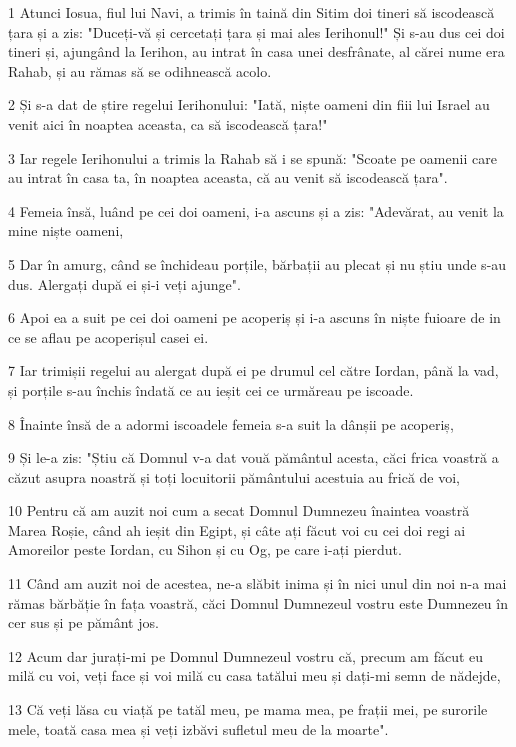\par 1 Atunci Iosua, fiul lui Navi, a trimis în taină din Sitim doi tineri să iscodească țara și a zis: "Duceți-vă și cercetați țara și mai ales Ierihonul!" Și s-au dus cei doi tineri și, ajungând la Ierihon, au intrat în casa unei desfrânate, al cărei nume era Rahab, și au rămas să se odihnească acolo.
\par 2 Și s-a dat de știre regelui Ierihonului: "Iată, niște oameni din fiii lui Israel au venit aici în noaptea aceasta, ca să iscodească țara!"
\par 3 Iar regele Ierihonului a trimis la Rahab să i se spună: "Scoate pe oamenii care au intrat în casa ta, în noaptea aceasta, că au venit să iscodească țara".
\par 4 Femeia însă, luând pe cei doi oameni, i-a ascuns și a zis: "Adevărat, au venit la mine niște oameni,
\par 5 Dar în amurg, când se închideau porțile, bărbații au plecat și nu știu unde s-au dus. Alergați după ei și-i veți ajunge".
\par 6 Apoi ea a suit pe cei doi oameni pe acoperiș și i-a ascuns în niște fuioare de in ce se aflau pe acoperișul casei ei.
\par 7 Iar trimișii regelui au alergat după ei pe drumul cel către Iordan, până la vad, și porțile s-au închis îndată ce au ieșit cei ce urmăreau pe iscoade.
\par 8 Înainte însă de a adormi iscoadele femeia s-a suit la dânșii pe acoperiș,
\par 9 Și le-a zis: "Știu că Domnul v-a dat vouă pământul acesta, căci frica voastră a căzut asupra noastră și toți locuitorii pământului acestuia au frică de voi,
\par 10 Pentru că am auzit noi cum a secat Domnul Dumnezeu înaintea voastră Marea Roșie, când ah ieșit din Egipt, și câte ați făcut voi cu cei doi regi ai Amoreilor peste Iordan, cu Sihon și cu Og, pe care i-ați pierdut.
\par 11 Când am auzit noi de acestea, ne-a slăbit inima și în nici unul din noi n-a mai rămas bărbăție în fața voastră, căci Domnul Dumnezeul vostru este Dumnezeu în cer sus și pe pământ jos.
\par 12 Acum dar jurați-mi pe Domnul Dumnezeul vostru că, precum am făcut eu milă cu voi, veți face și voi milă cu casa tatălui meu și dați-mi semn de nădejde,
\par 13 Că veți lăsa cu viață pe tatăl meu, pe mama mea, pe frații mei, pe surorile mele, toată casa mea și veți izbăvi sufletul meu de la moarte".
